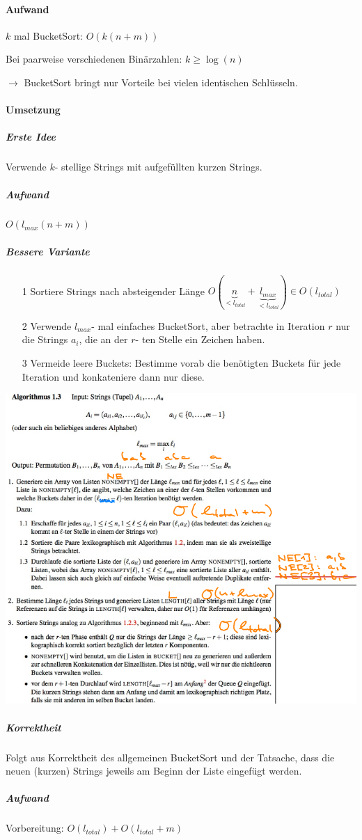 \documentclass[fleqn]{scrartcl}
\begin{document}
\paragraph{Aufwand}
$k$ mal BucketSort: $O(k(n+m))$

Bei paarweise verschiedenen Binärzahlen: $k \geq \log(n)$

$\rightarrow$ BucketSort bringt nur Vorteile bei vielen identischen Schlüsseln.

\paragraph{Umsetzung}
\subparagraph{Erste Idee} Verwende $k$- stellige Strings mit aufgefüllten kurzen Strings.
\subparagraph{Aufwand} $O(l_{max}(n+m))$
\newpage
\subparagraph{Bessere Variante}
\begin{itemize}
\item[1] Sortiere Strings nach absteigender Länge $O(\underbrace{n} _{< l_{total}} + \underbrace{l_{max}}_{< l_{total}}) \in O(l_{total})$
\item[2] Verwende $l_{max}$- mal einfaches BucketSort, aber betrachte in Iteration $r$ nur die Strings $a_i$, die an der $r$- ten Stelle ein Zeichen haben.
\item[3] Vermeide leere Buckets: Bestimme vorab die benötigten Buckets für jede Iteration und konkateniere dann nur diese.
\end{itemize}
\begin{center}
\includegraphics[width=\textwidth]{./BSStringAlgo.png}
\end{center}
\subparagraph{Korrektheit} Folgt aus Korrektheit des allgemeinen BucketSort und der Tatsache, dass die neuen (kurzen) Strings jeweils am Beginn der Liste eingefügt werden.
\subparagraph{Aufwand} Vorbereitung: $O(l_{total}) + O(l_{total} + m)$
\end{document}
